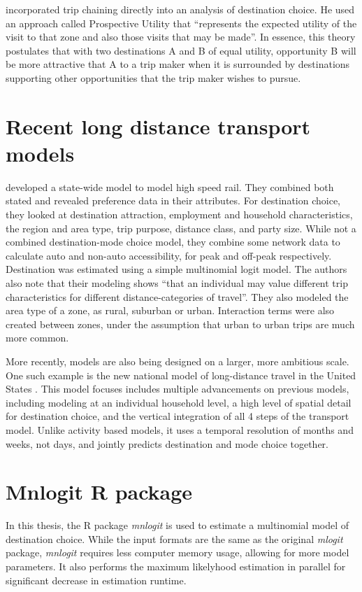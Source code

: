 \textcite{Kitamura84} incorporated trip chaining directly into an analysis of destination choice. He used an approach called Prospective Utility that \enquote{represents the expected utility of the visit to that zone and also those visits that may be made}. In essence, this theory postulates that with two destinations A and B of equal utility, opportunity B will be more attractive that A to a trip maker when it is surrounded by destinations supporting other opportunities that the trip maker wishes to pursue.

\section{Recent long distance transport models}
\autocite{Outwater10} developed a state-wide model to model high speed rail. They combined both stated and revealed preference data in their attributes. For destination choice, they looked at destination attraction, employment and household characteristics, the region and area type, trip purpose, distance class, and party size. While not a combined destination-mode choice model, they combine some network data to calculate auto and non-auto accessibility, for peak and off-peak respectively. Destination was estimated using a simple multinomial logit model. The authors also note that their modeling shows \enquote{that an individual may value different trip characteristics for different distance-categories of travel}. They also modeled the area type of a zone, as rural, suburban or urban. Interaction terms were also created between zones, under the assumption that urban to urban trips are much more common.

More recently, models are also being designed on a larger, more ambitious scale. One such example is the new national model of long-distance travel in the United States \parencite{Outwater15}. This model focuses includes multiple advancements on previous models, including modeling at an individual household level, a high level of spatial detail for destination choice, and the vertical integration of all 4 steps of the transport model. Unlike activity based models, it uses a temporal resolution of months and weeks, not days, and jointly predicts destination and mode choice together. 

\section{Mnlogit R package}
\label{section:mnlogit-structure}
\label{section:mnlogit}
In this thesis, the R package \textit{mnlogit} \parencite{hasan2014fast} is used to estimate a multinomial model of destination choice. While the input formats are the same as the original \textit{mlogit} package, \textit{mnlogit} requires less computer memory usage, allowing for more model parameters. It also performs the maximum likelyhood estimation in parallel for significant decrease in estimation runtime.
